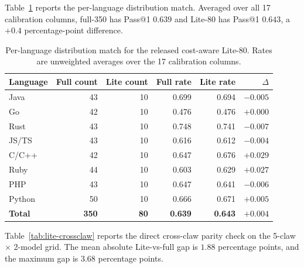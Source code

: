 Table~\ref{tab:lite-perlang} reports the per-language distribution
match.  Averaged over all 17 calibration columns, full-350 has Pass@1
$0.639$ and Lite-80 has Pass@1 $0.643$, a $+0.4$ percentage-point
difference.

\begin{table}[h]
\centering
\small
\caption{Per-language distribution match for the released cost-aware
Lite-80.  Rates are unweighted averages over the 17 calibration
columns.}
\label{tab:lite-perlang}
\begin{tabular}{lrrrrr}
\toprule
Language & Full count & Lite count & Full rate & Lite rate & $\Delta$ \\
\midrule
Java   & 43 & 10 & 0.699 & 0.694 & $-0.005$ \\
Go     & 42 & 10 & 0.476 & 0.476 & $+0.000$ \\
Rust   & 43 & 10 & 0.748 & 0.741 & $-0.007$ \\
JS/TS  & 43 & 10 & 0.616 & 0.612 & $-0.004$ \\
C/C++  & 42 & 10 & 0.647 & 0.676 & $+0.029$ \\
Ruby   & 44 & 10 & 0.603 & 0.629 & $+0.027$ \\
PHP    & 43 & 10 & 0.647 & 0.641 & $-0.006$ \\
Python & 50 & 10 & 0.666 & 0.671 & $+0.005$ \\
\midrule
\textbf{Total} & \textbf{350} & \textbf{80} & \textbf{0.639} & \textbf{0.643} & \textbf{$+0.004$} \\
\bottomrule
\end{tabular}
\end{table}

Table~\ref{tab:lite-crossclaw} reports the direct cross-claw parity
check on the 5-claw $\times$ 2-model grid.  The mean absolute Lite-vs-full
gap is $1.88$ percentage points, and the maximum gap is $3.68$ percentage
points.

